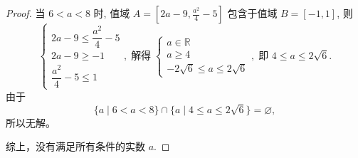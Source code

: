 \begin{proof}
当 \(6 < a < 8\) 时, 值域 \(A = \left\lbrack  {{2a} -9, \frac{{a}^{2}}{4} -5}\right\rbrack\) 包含于值域 \(B = \left\lbrack  {-1, 1}\right\rbrack\), 则
\[
\begin{cases}
    2a - 9 \leq \dfrac{a^2}{4} - 5 \\
    2a - 9 \geq -1 \\
    \dfrac{a^2}{4} - 5 \leq 1
\end{cases}, 
\; \text{解得} \; 
\begin{cases}
    a \in \mathbb{R} \\
    a \geq 4 \\
    -2\sqrt{6} \leq a \leq 2\sqrt{6}
\end{cases}, 
\; \text{即 } 4 \leq a \leq 2\sqrt{6}.
\]
由于  
\[
\{ a \mid 6 < a < 8 \} \cap \{ a \mid 4 \leq a \leq 2\sqrt{6} \} = \varnothing, 
\]  
所以无解。

综上，没有满足所有条件的实数 $a$.
\end{proof}


